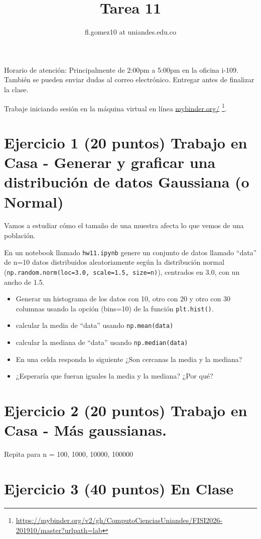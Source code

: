 \documentclass{article}
\title{Tarea 11}
\author{fl.gomez10 at uniandes.edu.co}
\begin{document}
\maketitle

Horario de atención: Principalmente de 2:00pm a 5:00pm en la oficina i-109.
También se pueden enviar dudas al correo electrónico.
Entregar antes de finalizar la clase. 

Trabaje iniciando  sesión en la máquina virtual en línea
\href{https://mybinder.org/v2/gh/ComputoCienciasUniandes/FISI2026-201910/master?urlpath=lab}{mybinder.org/}
\footnote{\url{https://mybinder.org/v2/gh/ComputoCienciasUniandes/FISI2026-201910/master?urlpath=lab}}. 


\section{Ejercicio 1 (20 puntos) Trabajo en Casa - Generar y graficar una distribución de datos Gaussiana (o Normal)}

Vamos a estudiar cómo el tamaño de una muestra afecta lo que vemos de una población.

En un notebook llamado \texttt{hw11.ipynb} genere un conjunto de datos
llamado ``data'' de n=10 datos distribuidos aleatoriamente según
la distribución normal (\texttt{np.random.norm(loc=3.0, scale=1.5, size=n)}),
centrados en 3.0, con un ancho de 1.5.

\begin{itemize}
\item Generar un histograma de los datos con 10, otro con 20
  y otro con 30 columnas usando la opción (bins=10) de la
  función \texttt{plt.hist()}.
\item calcular la media de ``data'' usando \texttt{np.mean(data)}
\item calcular la mediana de ``data'' usando \texttt{np.median(data)}
\item En una celda responda lo siguiente ¿Son cercanas la media y la mediana?
\item ¿Esperaría que fueran iguales la media y la mediana? ¿Por qué?
\end{itemize}

\section{Ejercicio 2 (20 puntos) Trabajo en Casa - Más gaussianas.}

Repita para n = {100, 1000, 10000, 100000}

\section{Ejercicio 3 (40 puntos) En Clase}
\end{document}

